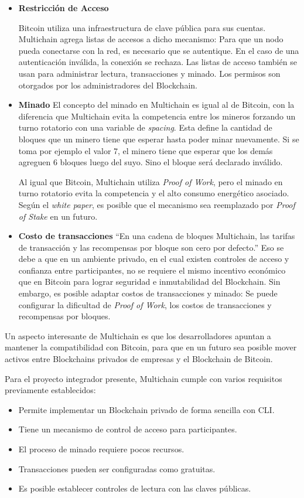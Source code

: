 \begin{itemize}
\item \textbf{Restricción de Acceso}

Bitcoin utiliza una infraestructura de clave pública para sus cuentas. Multichain agrega listas de accesos a dicho mecanismo:
Para que un nodo pueda conectarse con la red, es necesario que se autentique. En el caso de una autenticación inválida, la conexión se rechaza. Las listas de acceso también se usan para administrar lectura, transacciones y minado.
Los permisos son otorgados por los administradores del Blockchain.

\item \textbf{Minado}
El concepto del minado en Multichain es igual al de Bitcoin, con la diferencia que Multichain evita la competencia entre los mineros forzando un turno rotatorio con una variable de \textit{spacing}. Esta define la cantidad de bloques que un minero tiene que esperar hasta poder minar nuevamente. Si se toma por ejemplo el valor 7, el minero tiene que esperar que los demás agreguen 6 bloques luego del suyo. Sino el bloque será declarado inválido.

Al igual que Bitcoin, Multichain utiliza \textit{Proof of Work}, pero el minado en turno rotatorio evita la competencia y el alto consumo energético asociado. Según el \textit{white paper}, es posible que el mecanismo sea reemplazado por \textit{Proof of Stake} en un futuro.

\item \textbf{Costo de transacciones}
``En una cadena de bloques Multichain, las tarifas de transacción y las recompensas por bloque son cero por defecto.''\cite{multichain_whitepaper} Eso se debe a que en un ambiente privado, en el cual existen controles de acceso y confianza entre participantes, no se requiere el mismo incentivo económico que en Bitcoin para lograr seguridad e inmutabilidad del Blockchain.
Sin embargo, es posible adaptar costos de transacciones y minado: Se puede configurar la dificultad de \textit{Proof of Work}, los costos de transacciones y recompensas por bloques.

\end{itemize}

Un aspecto interesante de Multichain es que los desarrolladores apuntan a mantener la compatibilidad con Bitcoin, para que en un futuro sea posible mover activos entre Blockchains privados de empresas y el Blockchain de Bitcoin.

Para el proyecto integrador presente, 
Multichain cumple con varios requisitos previamente establecidos:
\begin{itemize}
\item[\textendash] Permite implementar un Blockchain privado de forma sencilla con CLI.
\item[\textendash] Tiene un mecanismo de control de acceso para participantes.
\item[\textendash] El proceso de minado requiere pocos recursos.
\item[\textendash] Transacciones pueden ser configuradas como gratuitas.
\item[\textendash] Es posible establecer controles de lectura con las claves públicas.
\end{itemize}

